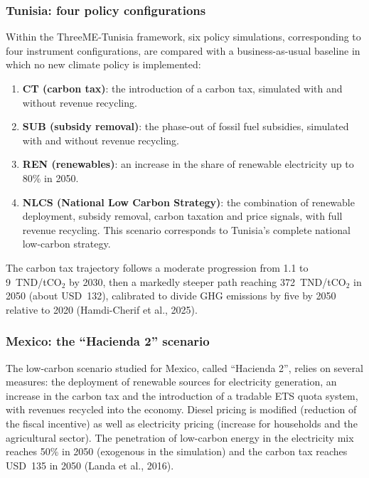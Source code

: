 \documentclass[12pt, a4paper]{article}
\begin{document}
\subsubsection{Tunisia: four policy configurations}

Within the ThreeME-Tunisia framework, six policy simulations, corresponding to four instrument configurations, are compared with a business-as-usual baseline in which no new climate policy is implemented:

\begin{enumerate}[label=(\roman*)]
    \item \textbf{CT (carbon tax)}: the introduction of a carbon tax, simulated with and without revenue recycling.
    \item \textbf{SUB (subsidy removal)}: the phase-out of fossil fuel subsidies, simulated with and without revenue recycling.
    \item \textbf{REN (renewables)}: an increase in the share of renewable electricity up to 80\% in 2050.
    \item \textbf{NLCS (National Low Carbon Strategy)}: the combination of renewable deployment, subsidy removal, carbon taxation and price signals, with full revenue recycling. This scenario corresponds to Tunisia's complete national low-carbon strategy.
\end{enumerate}

The carbon tax trajectory follows a moderate progression from 1.1 to 9~TND/tCO$_2$ by 2030, then a markedly steeper path reaching 372~TND/tCO$_2$ in 2050 (about USD~132), calibrated to divide GHG emissions by five by 2050 relative to 2020 (Hamdi-Cherif et al., 2025).

\subsubsection{Mexico: the ``Hacienda 2'' scenario}

The low-carbon scenario studied for Mexico, called ``Hacienda 2'', relies on several measures: the deployment of renewable sources for electricity generation, an increase in the carbon tax and the introduction of a tradable ETS quota system, with revenues recycled into the economy. Diesel pricing is modified (reduction of the fiscal incentive) as well as electricity pricing (increase for households and the agricultural sector). The penetration of low-carbon energy in the electricity mix reaches 50\% in 2050 (exogenous in the simulation) and the carbon tax reaches USD~135 in 2050 (Landa et al., 2016).
\end{document}
